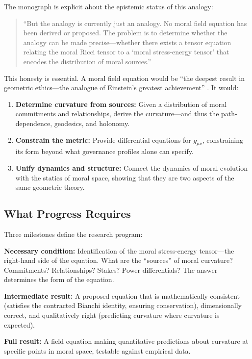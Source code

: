 \documentclass[12pt]{article}
\theoremstyle{definition}
\theoremstyle{remark}
\begin{document}
The monograph is explicit about the epistemic status of this analogy:

\begin{quote}
``But the analogy is currently just an analogy. No moral field equation has been derived or proposed. The problem is to determine whether the analogy can be made precise---whether there exists a tensor equation relating the moral Ricci tensor to a `moral stress-energy tensor' that encodes the distribution of moral sources.'' \citep[\S19.4]{anonymous2026ge}
\end{quote}

This honesty is essential. A moral field equation would be ``the deepest result in geometric ethics---the analogue of Einstein's greatest achievement'' \citep[\S19.4]{anonymous2026ge}. It would:

\begin{enumerate}
    \item \textbf{Determine curvature from sources:} Given a distribution of moral commitments and relationships, derive the curvature---and thus the path-dependence, geodesics, and holonomy.
    \item \textbf{Constrain the metric:} Provide differential equations for $g_{\mu\nu}$, constraining its form beyond what governance profiles alone can specify.
    \item \textbf{Unify dynamics and structure:} Connect the dynamics of moral evolution with the statics of moral space, showing that they are two aspects of the same geometric theory.
\end{enumerate}

\subsection{What Progress Requires}

Three milestones define the research program:

\textbf{Necessary condition:} Identification of the moral stress-energy tensor---the right-hand side of the equation. What are the ``sources'' of moral curvature? Commitments? Relationships? Stakes? Power differentials? The answer determines the form of the equation.

\textbf{Intermediate result:} A proposed equation that is mathematically consistent (satisfies the contracted Bianchi identity, ensuring conservation), dimensionally correct, and qualitatively right (predicting curvature where curvature is expected).

\textbf{Full result:} A field equation making quantitative predictions about curvature at specific points in moral space, testable against empirical data.
\end{document}

